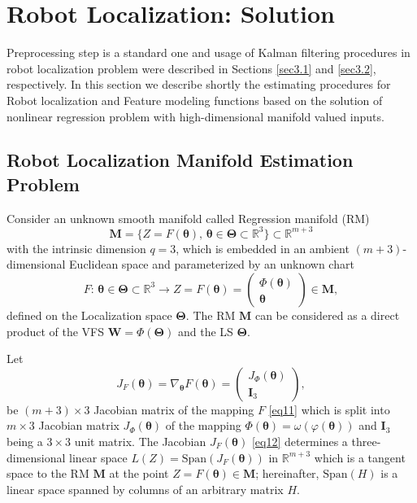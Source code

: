 \documentclass[conference]{IEEEtran} %
\def\mbW{\mathbf{W}}
\def\mbTheta{{\bm\Theta}}
\def\mbtheta{{\bm\theta}}
\def\mbM{\mathbf{M}}
\def\RR{\mathbb{R}}
\begin{document}
\section{Robot Localization: Solution}
\label{sec4}

Preprocessing step is a standard one and usage of Kalman filtering procedures in robot localization problem were described in Sections \ref{sec3.1} and \ref{sec3.2}, respectively. In this section we describe shortly the estimating procedures for Robot localization and Feature modeling functions based on the solution of nonlinear regression problem with high-dimensional manifold valued inputs.

\subsection{Robot Localization Manifold Estimation Problem}

Consider an unknown smooth manifold called Regression manifold (RM)
\begin{equation}
\label{eq10}
	\mbM = \{Z=F(\mbtheta),\,\mbtheta\in\mbTheta\subset\RR^3\}\subset\RR^{m+3}
\end{equation}
with the intrinsic dimension $q = 3$, which is embedded in an ambient $(m+3)$-dimensional Euclidean space and parameterized by an unknown chart
\begin{equation}
\label{eq11}
F:\,\mbtheta\in\mbTheta\subset\RR^3\to Z = F(\mbtheta) =
\left(
\begin{array}{c}
\Phi(\mbtheta)\\
\mbtheta
\end{array}
\right)
\in\mbM,
\end{equation}
defined on the Localization space $\mbTheta$.
The RM $\mbM$ can be considered as a direct product of the VFS $\mbW = \Phi(\mbTheta)$ and the LS $\mbTheta$.

Let
\begin{equation}
\label{eq12}
J_F(\mbtheta) = \nabla_{\mbtheta}F(\mbtheta) =
\left(
\begin{array}{c}
J_{\Phi}(\mbtheta)\\
\mathbf{I}_3
\end{array}
\right),
\end{equation}
be $(m+3)\times 3$ Jacobian matrix of the mapping $F$ \eqref{eq11} which is split into $m\times 3$ Jacobian matrix $J_{\Phi}(\mbtheta)$ of the mapping $\Phi(\mbtheta) = \omega(\varphi(\mbtheta))$ and $\mathbf{I}_3$ being a $3\times3$ unit matrix. The Jacobian $J_F(\mbtheta)$ \eqref{eq12} determines a three-dimensional linear space $L(Z) = \mathrm{Span}(J_F(\mbtheta))$ in $\RR^{m+3}$ which is a tangent space to the RM $\mbM$ at the point $Z = F(\mbtheta) \in\mbM$; hereinafter, $\mathrm{Span}(H)$ is a linear space spanned by columns of an arbitrary matrix $H$.
\end{document}
